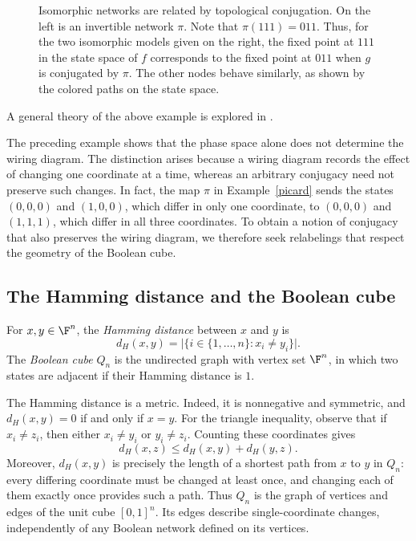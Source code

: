 \begin{example}
\begin{figure}[!ht]
  \caption{Isomorphic networks are related by topological conjugation. On the left is an invertible network $\pi$. Note that $\pi(111)=011$. Thus, for the two isomorphic models given on the right, the fixed point at $111$ in the state space of $f$ corresponds to the fixed point at $011$ when $g$ is conjugated by $\pi$. The other nodes behave similarly, as shown by the colored paths on the state space.}
  \label{fig:isomorphic}
\end{figure}

\end{example}

A general theory of the above example is explored in \cite{marchetto2021isomorphic}.

The preceding example shows that the phase space alone does not determine the wiring diagram. The distinction arises because a wiring diagram records the effect of changing one coordinate at a time, whereas an arbitrary conjugacy need not preserve such changes. In fact, the map $\pi$ in Example~\ref{picard} sends the states $(0,0,0)$ and $(1,0,0)$, which differ in only one coordinate, to $(0,0,0)$ and $(1,1,1)$, which differ in all three coordinates. To obtain a notion of conjugacy that also preserves the wiring diagram, we therefore seek relabelings that respect the geometry of the Boolean cube.

\subsection{The Hamming distance and the Boolean cube}

\begin{definition}
    For $x,y\in\F^n$, the \emph{Hamming distance} between $x$ and $y$ is
    \[
        d_H(x,y)=\bigl|\{i\in\{1,\dots,n\}:x_i\ne y_i\}\bigr|.
    \]
    The \emph{Boolean cube} $Q_n$ is the undirected graph with vertex set $\F^n$, in which two states are adjacent if their Hamming distance is $1$.
\end{definition}

The Hamming distance is a metric. Indeed, it is nonnegative and symmetric, and $d_H(x,y)=0$ if and only if $x=y$. For the triangle inequality, observe that if $x_i\ne z_i$, then either $x_i\ne y_i$ or $y_i\ne z_i$. Counting these coordinates gives
\[
    d_H(x,z)\le d_H(x,y)+d_H(y,z).
\]
Moreover, $d_H(x,y)$ is precisely the length of a shortest path from $x$ to $y$ in $Q_n$: every differing coordinate must be changed at least once, and changing each of them exactly once provides such a path. Thus $Q_n$ is the graph of vertices and edges of the unit cube $[0,1]^n$. Its edges describe single-coordinate changes, independently of any Boolean network defined on its vertices.

